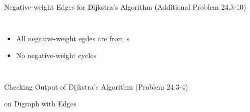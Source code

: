 \begin{frame}{}
  \begin{exampleblock}{Negative-weight Edges for Dijkstra's Algorithm (Additional Problem $24.3$-$10$)}
    \begin{columns}
	\begin{itemize}
	  \item All negative-weight egdes are from $s$
	  \item No negative-weight cycles
	\end{itemize}
    \end{columns}
  \end{exampleblock}

  \pause
\end{frame}

\begin{frame}{}
  \begin{exampleblock}{Checking Output of Dijkstra's Algorithm (Problem $24.3$-$4$)}
  \end{exampleblock}
\end{frame}

\begin{frame}{}
\end{frame}

\begin{frame}{}
  \begin{center}

     on Digraph with  Edges \\[30pt]

  \end{center}
\end{frame}
